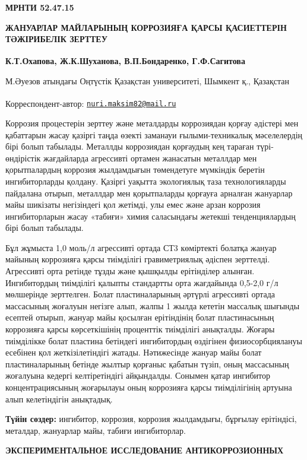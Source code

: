 

\newpage
{\bfseries МРНТИ 52.47.15}

{\bfseries ЖАНУАРЛАР МАЙЛАРЫНЫҢ КОРРОЗИЯҒА ҚАРСЫ ҚАСИЕТТЕРІН ТӘЖІРИБЕЛІК
ЗЕРТТЕУ}

{\bfseries К.Т.Охапова\textsuperscript{\envelope }, Ж.К.Шуханова, В.П.Бондаренко,
Г.Ф.Сагитова}

М.Әуезов атындағы Оңтүстік Қазақстан университеті, Шымкент қ., Қазақстан

{\bfseries \textsuperscript{\envelope }}Корреспондент-автор:
\href{mailto:nuri.maksim82@mail.ru}{\nolinkurl{nuri.maksim82@mail.ru}}

Коррозия процестерін зерттеу және металдарды коррозиядан қорғау әдістері
мен қабаттарын жасау қазіргі таңда өзекті заманауи ғылыми-техникалық
мәселелердің бірі болып табылады. Металлды коррозиядан қорғаудың кең
тараған түрі- өндірістік жағдайларда агрессивті ортамен жанасатын
металлдар мен қорытпалардың коррозия жылдамдығын төмендетуге мүмкіндік
беретін ингибиторларды қолдану. Қазіргі уақытта экологиялық таза
технологияларды пайдалана отырып, металлдар мен қорытпаларды қорғауға
арналған жануарлар майы шикізаты негізіндегі қол жетімді, улы емес және
арзан коррозия ингибиторларын жасау «табиғи» химия саласындағы жетекші
тенденциялардың бірі болып табылады.

Бұл жұмыста 1,0 моль/л агрессивті ортада СТ3 көміртекті болатқа жануар
майының коррозияға қарсы тиімділігі гравиметриялық әдіспен зерттелді.
Агрессивті орта ретінде тұзды және қышқылды ерітінділер алынған.
Ингибитордың тиімділігі қалыпты стандартты орта жағдайында 0,5-2,0 г/л
мөлшерінде зерттелген. Болат пластиналарының әртүрлі агрессивті ортада
массасының жоғалуын негізге алып, жалпы 1 жылда кететін массалық шығынды
есептей отырып, жануар майы қосылған ерітіндінің болат пластинасының
коррозияға қарсы көрсеткішінің проценттік тиімділігі анықталды. Жоғары
тиімділікке болат пластина бетіндегі ингибитордың өздігінен
физиосорбциялануы есебінен қол жеткізілетіндігі жатады. Нәтижесінде
жануар майы болат пластиналарының бетінде жылтыр қорғаныс қабатын түзіп,
оның массасының жоғалуына кедергі келтіретіндігі айқындалды. Сонымен
қатар ингибитор концентрациясының жоғарылауы оның коррозияға қарсы
тиімділігінің артуына алып келетіндігін анықтадық.

{\bfseries Түйін сөздер:} ингибитор, коррозия, коррозия жылдамдығы,
бұрғылау ерітіндісі, металдар, жануарлар майы, табиғи ингибиторлар.

{\bfseries ЭКСПЕРИМЕНТАЛЬНОЕ ИССЛЕДОВАНИЕ АНТИКОРРОЗИОННЫХ}

